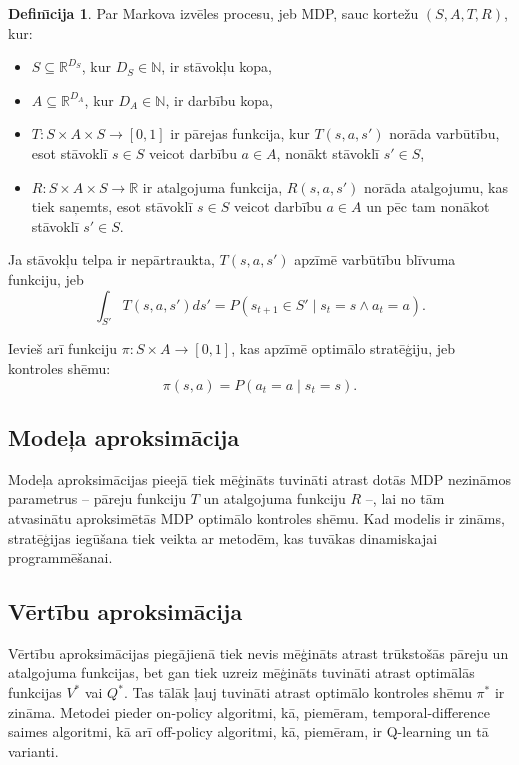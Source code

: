 \documentclass[a0,landscape]{a0poster}
\numberwithin{equation}{section}
\theoremstyle{definition}
\newtheorem{definicija}{Defin\={\i}cija}%
\theoremstyle{plain}
\begin{document}
\begin{multicols}{4}
\begin{definicija}
Par Markova izvēles procesu, jeb MDP, sauc kortežu $(S, A, T, R)$, kur:
\begin{itemize}
	\item $S \subseteq \mathbb{R}^{D_S}$, kur $D_S \in \mathbb{N}$, ir stāvokļu kopa, %
	\item $A \subseteq \mathbb{R}^{D_A}$, kur $D_A \in \mathbb{N}$, ir darbību kopa, %
	\item $T:S \times A \times S \rightarrow [0,1]$ ir pārejas funkcija, kur $T(s, a, s')$ norāda varbūtību, esot stāvoklī $s \in S$ veicot darbību $a \in A$, nonākt stāvoklī $s' \in S$,
	\item $R:S \times A \times S \rightarrow \mathbb{R}$ ir atalgojuma funkcija, $R(s, a, s')$ norāda atalgojumu, kas tiek saņemts, esot stāvoklī $s \in S$ veicot darbību $a \in A$ un pēc tam nonākot stāvoklī $s' \in S$.
\end{itemize}
Ja stāvokļu telpa ir nepārtraukta, $T(s, a, s')$ apzīmē varbūtību blīvuma funkciju, jeb
\[
	\int_{S'} T(s, a, s')ds' = P(s_{t+1} \in S' \mid s_t = s \land a_t = a).
\]
\end{definicija}

Ievieš arī funkciju $\pi: S \times A \rightarrow [0, 1]$, kas apzīmē optimālo stratēģiju, jeb kontroles shēmu:
\[
	\pi(s, a) = P(a_t = a \mid s_t = s).
\]

\subsection*{Modeļa aproksimācija}
Modeļa aproksimācijas pieejā tiek mēģināts tuvināti atrast dotās MDP nezināmos parametrus -- pāreju funkciju $T$ un atalgojuma funkciju $R$ --, lai no tām atvasinātu aproksimētās MDP optimālo kontroles shēmu.
Kad modelis ir zināms, stratēģijas iegūšana tiek veikta ar metodēm, kas tuvākas dinamiskajai programmēšanai.

\subsection*{Vērtību aproksimācija}
Vērtību aproksimācijas piegājienā tiek nevis mēģināts atrast trūkstošās pāreju un atalgojuma funkcijas, bet gan tiek uzreiz mēģināts tuvināti atrast optimālās funkcijas $V^*$ vai $Q^*$.
Tas tālāk ļauj tuvināti atrast optimālo kontroles shēmu $\pi^*$ ir zināma.
Metodei pieder on-policy algoritmi, kā, piemēram, temporal-difference saimes algoritmi, kā arī off-policy algoritmi, kā, piemēram, ir Q-learning un tā varianti.


\end{multicols}
\end{document}
